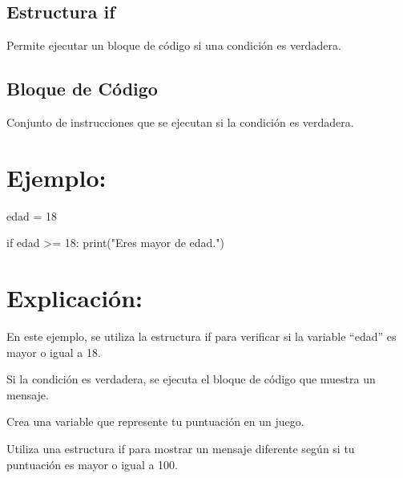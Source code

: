 \documentclass[
  a4paper,
  DIV=11,
  numbers=noendperiod,
  onepage,
  openany]{scrreprt}
\newenvironment{Shaded}{\begin{snugshade}}{\end{snugshade}}
\newcommand{\BuiltInTok}[1]{\textcolor[rgb]{0.00,0.23,0.31}{#1}}
\newcommand{\ControlFlowTok}[1]{\textcolor[rgb]{0.00,0.23,0.31}{#1}}
\newcommand{\DecValTok}[1]{\textcolor[rgb]{0.68,0.00,0.00}{#1}}
\newcommand{\NormalTok}[1]{\textcolor[rgb]{0.00,0.23,0.31}{#1}}
\newcommand{\OperatorTok}[1]{\textcolor[rgb]{0.37,0.37,0.37}{#1}}
\newcommand{\StringTok}[1]{\textcolor[rgb]{0.13,0.47,0.30}{#1}}
\begin{document}
\hypertarget{estructura-if}{%
\subsection{Estructura if}\label{estructura-if}}

Permite ejecutar un bloque de código si una condición es verdadera.

\hypertarget{bloque-de-cuxf3digo}{%
\subsection{Bloque de Código}\label{bloque-de-cuxf3digo}}

Conjunto de instrucciones que se ejecutan si la condición es verdadera.

\hypertarget{ejemplo-28}{%
\section{Ejemplo:}\label{ejemplo-28}}

\begin{Shaded}
\begin{Highlighting}[]
\NormalTok{edad }\OperatorTok{=} \DecValTok{18}

\ControlFlowTok{if}\NormalTok{ edad }\OperatorTok{\textgreater{}=} \DecValTok{18}\NormalTok{:}
    \BuiltInTok{print}\NormalTok{(}\StringTok{"Eres mayor de edad."}\NormalTok{)}
\end{Highlighting}
\end{Shaded}

\hypertarget{explicaciuxf3n-28}{%
\section{Explicación:}\label{explicaciuxf3n-28}}

En este ejemplo, se utiliza la estructura if para verificar si la
variable ``edad'' es mayor o igual a 18.

Si la condición es verdadera, se ejecuta el bloque de código que muestra
un mensaje.

\begin{tcolorbox}[enhanced jigsaw, colbacktitle=quarto-callout-important-color!10!white, toprule=.15mm, leftrule=.75mm, titlerule=0mm, opacityback=0, rightrule=.15mm, opacitybacktitle=0.6, breakable, left=2mm, coltitle=black, title=\textcolor{quarto-callout-important-color}{\faExclamation}\hspace{0.5em}{Actividad Práctica:}, toptitle=1mm, bottomtitle=1mm, arc=.35mm, bottomrule=.15mm, colback=white, colframe=quarto-callout-important-color-frame]

Crea una variable que represente tu puntuación en un juego.

Utiliza una estructura if para mostrar un mensaje diferente según si tu
puntuación es mayor o igual a 100.

\end{tcolorbox}
\end{document}
